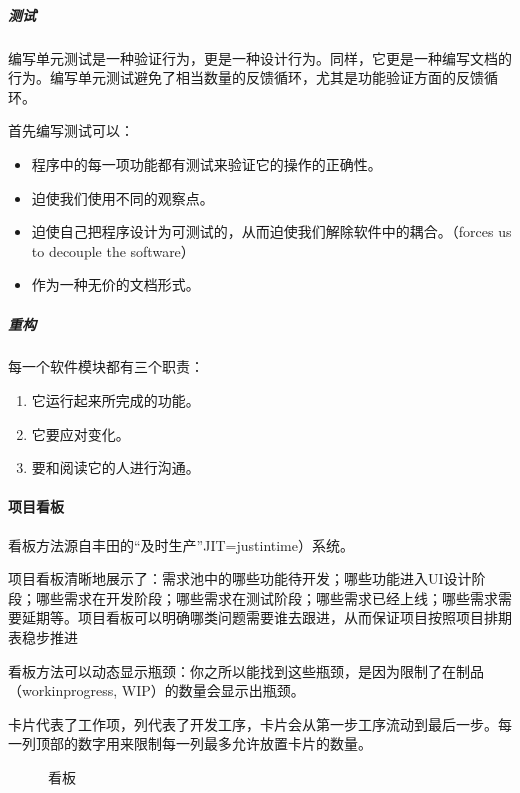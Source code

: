 \documentclass[letterpaper,10pt,english]{sphinxmanual}
\begin{document}
\subparagraph{测试}
\label{\detokenize{chapter_project/Scrum:id14}}
编写单元测试是一种验证行为，更是一种设计行为。同样，它更是一种编写文档的行为。编写单元测试避免了相当数量的反馈循环，尤其是功能验证方面的反馈循环。

首先编写测试可以：
\begin{itemize}
\item {} 
程序中的每一项功能都有测试来验证它的操作的正确性。

\item {} 
迫使我们使用不同的观察点。

\item {} 
迫使自己把程序设计为可测试的，从而迫使我们解除软件中的耦合。（forces
us to decouple the software）

\item {} 
作为一种无价的文档形式。

\end{itemize}


\subparagraph{重构}
\label{\detokenize{chapter_project/Scrum:id15}}
每一个软件模块都有三个职责：
\begin{enumerate}
%
\item {} 
它运行起来所完成的功能。

\item {} 
它要应对变化。

\item {} 
要和阅读它的人进行沟通。

\end{enumerate}


\paragraph{项目看板}
\label{\detokenize{chapter_project/Scrum:id16}}
看板方法源自丰田的“及时生产”JIT=just\sphinxhyphen{}in\sphinxhyphen{}time）系统。

项目看板清晰地展示了：需求池中的哪些功能待开发；哪些功能进入UI设计阶段；哪些需求在开发阶段；哪些需求在测试阶段；哪些需求已经上线；哪些需求需要延期等。项目看板可以明确哪类问题需要谁去跟进，从而保证项目按照项目排期表稳步推进

看板方法可以动态显示瓶颈：你之所以能找到这些瓶颈，是因为限制了在制品（work\sphinxhyphen{}in\sphinxhyphen{}progress,
WIP）的数量会显示出瓶颈。

卡片代表了工作项，列代表了开发工序，卡片会从第一步工序流动到最后一步。每一列顶部的数字用来限制每一列最多允许放置卡片的数量。

\begin{figure}[H]
\centering
\capstart

\noindent{}
\caption{看板}\label{\detokenize{chapter_project/Scrum:id22}}\end{figure}
\end{document}
